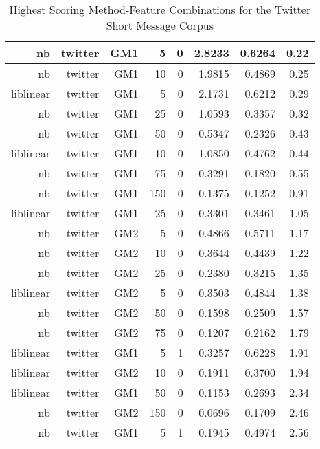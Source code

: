 \begin{table}[htbp!]
\begin{center}
\begin{tabular}{ | r | r | r | r | r | r | r | r | }
			nb & twitter & GM1 & 5 & 0 & 2.8233 & 0.6264 & 0.22\\ \hline 
			nb & twitter & GM1 & 10 & 0 & 1.9815 & 0.4869 & 0.25\\ \hline 
			liblinear & twitter & GM1 & 5 & 0 & 2.1731 & 0.6212 & 0.29\\ \hline 
			nb & twitter & GM1 & 25 & 0 & 1.0593 & 0.3357 & 0.32\\ \hline 
			nb & twitter & GM1 & 50 & 0 & 0.5347 & 0.2326 & 0.43\\ \hline 
			liblinear & twitter & GM1 & 10 & 0 & 1.0850 & 0.4762 & 0.44\\ \hline 
			nb & twitter & GM1 & 75 & 0 & 0.3291 & 0.1820 & 0.55\\ \hline 
			nb & twitter & GM1 & 150 & 0 & 0.1375 & 0.1252 & 0.91\\ \hline 
			liblinear & twitter & GM1 & 25 & 0 & 0.3301 & 0.3461 & 1.05\\ \hline 
			nb & twitter & GM2 & 5 & 0 & 0.4866 & 0.5711 & 1.17\\ \hline 
			nb & twitter & GM2 & 10 & 0 & 0.3644 & 0.4439 & 1.22\\ \hline 
			nb & twitter & GM2 & 25 & 0 & 0.2380 & 0.3215 & 1.35\\ \hline 
			liblinear & twitter & GM2 & 5 & 0 & 0.3503 & 0.4844 & 1.38\\ \hline 
			nb & twitter & GM2 & 50 & 0 & 0.1598 & 0.2509 & 1.57\\ \hline 
			nb & twitter & GM2 & 75 & 0 & 0.1207 & 0.2162 & 1.79\\ \hline 
			liblinear & twitter & GM1 & 5 & 1 & 0.3257 & 0.6228 & 1.91\\ \hline 
			liblinear & twitter & GM2 & 10 & 0 & 0.1911 & 0.3700 & 1.94\\ \hline 
			liblinear & twitter & GM1 & 50 & 0 & 0.1153 & 0.2693 & 2.34\\ \hline 
			nb & twitter & GM2 & 150 & 0 & 0.0696 & 0.1709 & 2.46\\ \hline 
			nb & twitter & GM1 & 5 & 1 & 0.1945 & 0.4974 & 2.56\\ \hline 

		\end{tabular}
		\caption{Highest Scoring Method-Feature Combinations for the Twitter Short Message Corpus}
		\label{tab:top_twitter_by_score}
	\end{center}
\end{table}

